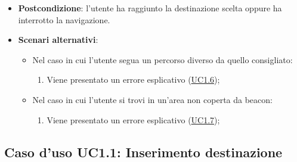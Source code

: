 \documentclass[../AnalisiDeiRequisiti.tex]{subfiles}
\begin{document}
\begin{itemize}
\begin{enumerate}
	\end{enumerate}
	\item \textbf{Postcondizione}: l'utente ha raggiunto la destinazione scelta oppure ha interrotto la navigazione.
	\item \textbf{Scenari alternativi}: 
	\begin{itemize}
		\item Nel caso in cui l'utente segua un percorso diverso da quello consigliato: 
		\begin{enumerate}
			\item Viene presentato un errore esplicativo (\hyperlink{UC1.6}{UC1.6});
		\end{enumerate}
		\item Nel caso in cui l'utente si trovi in un'area non coperta da beacon: 
		\begin{enumerate}
			\item Viene presentato un errore esplicativo (\hyperlink{UC1.7}{UC1.7});
		\end{enumerate}
	\end{itemize}
\end{itemize}
\hypertarget{UC1.1}{}
\subsection{Caso d'uso UC1.1: Inserimento destinazione}
\end{document}

